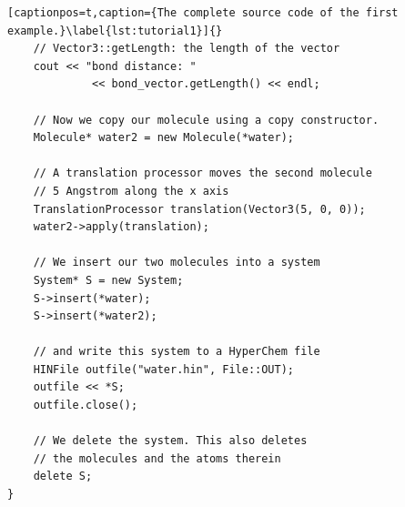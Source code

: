 \begin{lstlisting}[captionpos=t,caption={The complete source code of the first example.}\label{lst:tutorial1}]{}
	// Vector3::getLength: the length of the vector
	cout << "bond distance: " 
			 << bond_vector.getLength() << endl;

	// Now we copy our molecule using a copy constructor.
	Molecule* water2 = new Molecule(*water);

	// A translation processor moves the second molecule
	// 5 Angstrom along the x axis
	TranslationProcessor translation(Vector3(5, 0, 0));
	water2->apply(translation);

	// We insert our two molecules into a system
	System* S = new System;
	S->insert(*water);
	S->insert(*water2);

	// and write this system to a HyperChem file
	HINFile outfile("water.hin", File::OUT);
	outfile << *S;
	outfile.close();

	// We delete the system. This also deletes 
	// the molecules and the atoms therein
	delete S;
}
\end{lstlisting}
